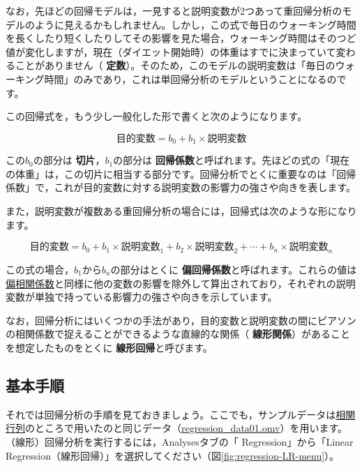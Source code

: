 \documentclass[
  12pt,
  a5jpaper,
  lualatex, ja=standard]{bxjsbook}
\renewcommand{\emph}[1]{\textbf{\color{emph} #1}}
\newcommand{\infig}[1]{\raisebox{-.2\zh}{\texttt{[image: images/assets/\#1]}}}
\begin{document}
なお，先ほどの回帰モデルは，一見すると説明変数が2つあって重回帰分析のモデルのように見えるかもしれません。しかし，この式で毎日のウォーキング時間を長くしたり短くしたりしてその影響を見た場合，ウォーキング時間はそのつど値が変化しますが，現在（ダイエット開始時）の体重はすでに決まっていて変わることがありません（\emph{定数}）。そのため，このモデルの説明変数は「毎日のウォーキング時間」のみであり，これは単回帰分析のモデルということになるのです。

この回帰式を，もう少し一般化した形で書くと次のようになります。

\[
目的変数 = b_0 + b_1 \times 説明変数
\]

この\(b_0\)の部分は\emph{切片}，\(b_1\)の部分は\emph{回帰係数}と呼ばれます。先ほどの式の「現在の体重」は，この切片に相当する部分です。回帰分析でとくに重要なのは「回帰係数」で，これが目的変数に対する説明変数の影響力の強さや向きを表します。

また，説明変数が複数ある重回帰分析の場合には，回帰式は次のような形になります。

\[
目的変数 = b_0 + b_1 \times 説明変数_{1} + b_2 \times 説明変数_{2}+ \cdots + b_n \times 説明変数_{n}
\]

この式の場合，\(b_1\)から\(b_n\)の部分はとくに\emph{偏回帰係数}と呼ばれます。これらの値は\protect\hyperlink{sec:regression-partial}{偏相関係数}と同様に他の変数の影響を除外して算出されており，それぞれの説明変数が単独で持っている影響力の強さや向きを示しています。

なお，回帰分析にはいくつかの手法があり，目的変数と説明変数の間にピアソンの相関係数で捉えることができるような直線的な関係（\emph{線形関係}）があることを想定したものをとくに\emph{線形回帰}と呼びます。

\hypertarget{sub:regression-LR-howto}{%
\subsection{基本手順}\label{sub:regression-LR-howto}}

それでは回帰分析の手順を見ておきましょう。ここでも，サンプルデータは\protect\hyperlink{sec:regression-cormat}{相関行列}のところで用いたのと同じデータ（\href{https://github.com/sbtseiji/jmv_compguide/raw/main/data/omv/regression_data01.omv}{regression\_data01.omv}）を用います。（線形）回帰分析を実行するには，Analysesタブの「\infig{analysis-regression.pdf} Regression」から「Linear Regression（線形回帰）」を選択してください（図\ref{fig:regression-LR-menu}）。
\end{document}
